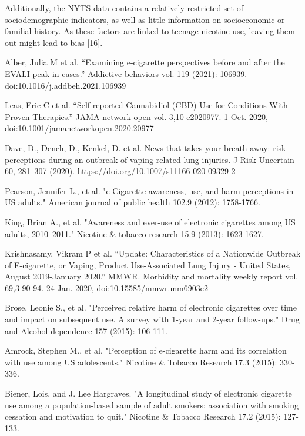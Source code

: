 \documentclass[12pt]{article}
\begin{document}
Additionally, the NYTS data contains a relatively restricted set of sociodemographic indicators, as well as little information on socioeconomic or familial history. As these factors are linked to teenage nicotine use, leaving them out might lead to bias [16]. 

\newpage
\begin{thebibliography}{}
Alber, Julia M et al. “Examining e-cigarette perspectives before and after the EVALI peak in cases.” Addictive behaviors vol. 119 (2021): 106939. doi:10.1016/j.addbeh.2021.106939

Leas, Eric C et al. “Self-reported Cannabidiol (CBD) Use for Conditions With Proven Therapies.” JAMA network open vol. 3,10 e2020977. 1 Oct. 2020, doi:10.1001/jamanetworkopen.2020.20977


Dave, D., Dench, D., Kenkel, D. et al. News that takes your breath away: risk perceptions during an outbreak of vaping-related lung injuries. J Risk Uncertain 60, 281–307 (2020). https://doi.org/10.1007/s11166-020-09329-2

Pearson, Jennifer L., et al. "e-Cigarette awareness, use, and harm perceptions in US adults." American journal of public health 102.9 (2012): 1758-1766.

King, Brian A., et al. "Awareness and ever-use of electronic cigarettes among US adults, 2010–2011." Nicotine \& tobacco research 15.9 (2013): 1623-1627.

Krishnasamy, Vikram P et al. “Update: Characteristics of a Nationwide Outbreak of E-cigarette, or Vaping, Product Use-Associated Lung Injury - United States, August 2019-January 2020.” MMWR. Morbidity and mortality weekly report vol. 69,3 90-94. 24 Jan. 2020, doi:10.15585/mmwr.mm6903e2


Brose, Leonie S., et al. "Perceived relative harm of electronic cigarettes over time and impact on subsequent use. A survey with 1-year and 2-year follow-ups." Drug and Alcohol dependence 157 (2015): 106-111.

Amrock, Stephen M., et al. "Perception of e-cigarette harm and its correlation with use among US adolescents." Nicotine \& Tobacco Research 17.3 (2015): 330-336.

Biener, Lois, and J. Lee Hargraves. "A longitudinal study of electronic cigarette use among a population-based sample of adult smokers: association with smoking cessation and motivation to quit." Nicotine \& Tobacco Research 17.2 (2015): 127-133.


\end{thebibliography}
\end{document}
